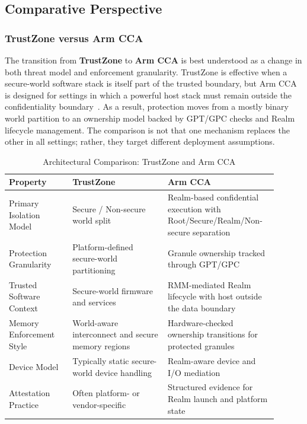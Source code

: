 \subsection{Comparative Perspective}

\subsubsection{TrustZone versus Arm CCA}

The transition from \textbf{TrustZone} to \textbf{Arm CCA} is best understood as a change in both threat model and enforcement granularity. TrustZone is effective when a secure-world software stack is itself part of the trusted boundary, but Arm CCA is designed for settings in which a powerful host stack must remain outside the confidentiality boundary~\cite{arm_trustzone_whitepaper,pinto2019trustzone,li2022cca,arm_cca_spec,arm_rme_spec,arm_rmm_spec}. As a result, protection moves from a mostly binary world partition to an ownership model backed by GPT/GPC checks and Realm lifecycle management. The comparison is not that one mechanism replaces the other in all settings; rather, they target different deployment assumptions.

\begin{table}[htbp]
\centering
\caption{Architectural Comparison: TrustZone and Arm CCA}
\label{tab:tz_vs_cca}
\begin{tabular}{@{}p{0.22\linewidth}p{0.33\linewidth}p{0.35\linewidth}@{}}
\toprule
\textbf{Property} & \textbf{TrustZone} & \textbf{Arm CCA} \\ \midrule
Primary Isolation Model & Secure / Non-secure world split & Realm-based confidential execution with Root/Secure/Realm/Non-secure separation \\
Protection Granularity & Platform-defined secure-world partitioning & Granule ownership tracked through GPT/GPC \\
Trusted Software Context & Secure-world firmware and services & RMM-mediated Realm lifecycle with host outside the data boundary \\
Memory Enforcement Style & World-aware interconnect and secure memory regions & Hardware-checked ownership transitions for protected granules \\
Device Model & Typically static secure-world device handling & Realm-aware device and I/O mediation \\
Attestation Practice & Often platform- or vendor-specific & Structured evidence for Realm launch and platform state \\ \bottomrule
\end{tabular}
\end{table}

